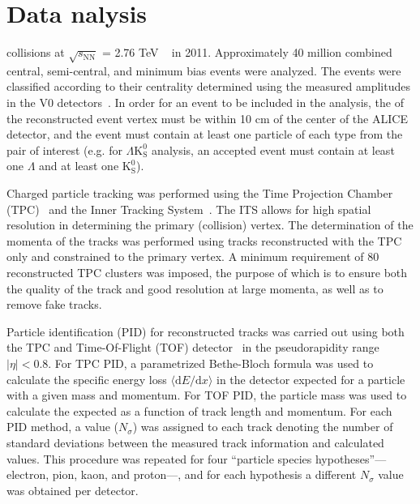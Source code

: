 \documentclass[ALICE,manyauthors]{cernphprep}
\newcommand{\pt}{$p_{\mathrm{T}}$\xspace}
\newcommand{\Lam}{$\Lambda$\xspace}
\newcommand{\Ks}{$\mathrm{K^{0}_{S}}$\xspace}
\newcommand{\LamKs}{$\Lambda\mathrm{K^{0}_{S}}$\xspace}
\begin{document}
\section{Data {\color{red}{A}}{\color{blue}{a}}nalysis}
\label{sec:DataAnalysis}

{\color{red}{The dataset analyzed is from Pb-Pb}} {\color{blue}{This work reports on the analysis of Pb--Pb}} collisions at $\sqrt{s_{\mathrm{NN}}}$ = 2.76 TeV {\color{red}{at the LHC measured by the ALICE detector}} {\color{blue}{produced by the LHC and measured by the ALICE experiment}}~\cite{Aamodt:2008zz} in 2011.
Approximately 40 million combined central, semi-central, and minimum bias events were analyzed.
The events were classified according to their centrality {\color{blue}{percentiles}} determined using the measured amplitudes in the V0 detectors~\cite{Abelev:2013qoq}.  
In order for an event to be included in the analysis, the {\color{red}{z-position}} {\color{blue}{$z$ position}} of the reconstructed event vertex must be within 10 cm of the center of the ALICE detector, and the event must contain at least one particle of each type from the pair of interest (e.g.{\color{blue}{,}} for \LamKs analysis, an accepted event must contain at least one \Lam and at least one \Ks). 

Charged particle tracking was performed using the Time Projection Chamber (TPC)~\cite{2010NIMPA.622..316A} and the Inner Tracking System~\cite{Abelevetal:2014dna}.  
The ITS allows for high spatial resolution in determining the primary (collision) vertex.
The determination of the momenta of the tracks was performed using tracks reconstructed with the TPC only and constrained to the primary vertex.
A minimum requirement of 80 reconstructed TPC clusters was imposed, the purpose of which is to ensure both the quality of the track and good {\color{red}{\pt}} {\color{blue}{transverse momentum (\pt)}} resolution at large momenta, as well as to remove fake tracks.

Particle identification (PID) for reconstructed tracks was carried out using both the TPC and Time-Of-Flight (TOF) detector{\color{blue}{s}}~\cite{Abelev:2014ffa, Akindinov:2013tea} in the pseudorapidity range $|\eta| < 0.8$.  
For TPC PID, a parametrized Bethe-Bloch formula was used to calculate the specific energy loss $\langle \mathrm{d}E/\mathrm{d}x \rangle$ in the detector expected for a particle with a given mass and momentum.  
For TOF PID, the particle mass was used to calculate the expected {\color{red}{time-of-flight}} {\color{blue}{time of flight}} as a function of track length and momentum.  
For each PID method, a value ($N_{\sigma}$) was assigned to each track denoting the number of standard deviations between the measured track information and calculated values.  
This procedure was repeated for four ``particle species hypotheses''--- electron, pion, kaon, and proton---, and for each hypothesis a different $N_{\sigma}$ value was obtained per detector.
\end{document}
